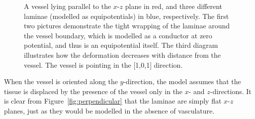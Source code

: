   \begin{figure}[htbp]
    \centering
    \caption{A vessel lying parallel to the $x$-$z$ plane in red, and three different laminae (modelled as equipotentials) in blue, respectively. The first two pictures demonstrate the tight wrapping of the laminae around the vessel boundary, which is modelled as a conductor at zero potential, and thus is an equipotential itself. The third diagram illustrates how the deformation decreases with distance from the vessel. The vessel is pointing in the [1,0,1] direction.}
    \label{fig:coplanar}
  \end{figure}
  
  When the vessel is oriented along the $y$-direction, the model assumes that the tissue is displaced by the presence of the vessel only in the $x$- and $z$-directions. It is clear from Figure~\ref{fig:perpendicular} that the laminae are simply flat $x$-$z$ planes, just as they would be modelled in the absence of vasculature.
  
